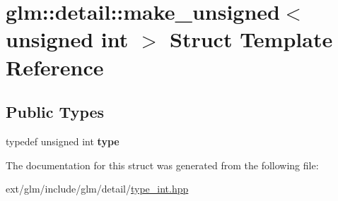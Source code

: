 \hypertarget{structglm_1_1detail_1_1make__unsigned_3_01unsigned_01int_01_4}{\section{glm\-:\-:detail\-:\-:make\-\_\-unsigned$<$ unsigned int $>$ Struct Template Reference}
\label{structglm_1_1detail_1_1make__unsigned_3_01unsigned_01int_01_4}
}
\subsection*{Public Types}
\begin{DoxyCompactItemize}
\item 
\hypertarget{structglm_1_1detail_1_1make__unsigned_3_01unsigned_01int_01_4_aea3e796456b317dd2247889d3fbb9d68}{typedef unsigned int {\bfseries type}}\label{structglm_1_1detail_1_1make__unsigned_3_01unsigned_01int_01_4_aea3e796456b317dd2247889d3fbb9d68}

\end{DoxyCompactItemize}


The documentation for this struct was generated from the following file\-:\begin{DoxyCompactItemize}
\item 
ext/glm/include/glm/detail/\hyperlink{type__int_8hpp}{type\-\_\-int.\-hpp}\end{DoxyCompactItemize}
